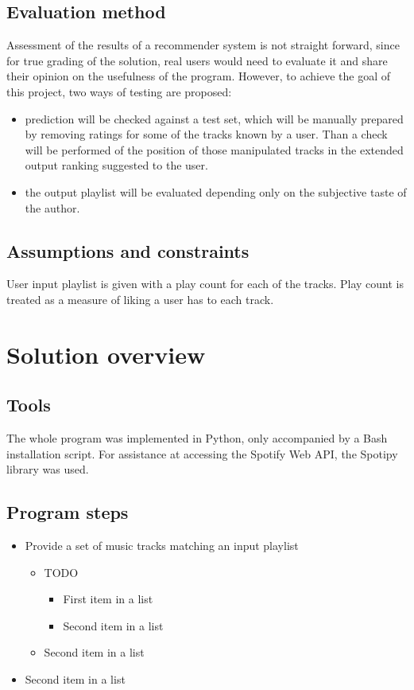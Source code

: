 \documentclass{article}
\numberwithin{equation}{section}		%
\numberwithin{figure}{section}			%
\numberwithin{table}{section}				%
\begin{document}
\subsection{Evaluation method}
Assessment of the results of a recommender system is not straight forward, since for true grading of the solution, real users would need to evaluate it and share their opinion on the usefulness of the program. However, to achieve the goal of this project, two ways of testing are proposed:
\begin{itemize}
\item prediction will be checked against a test set, which will be manually prepared by removing ratings for some of the tracks known by a user. Than a check will be performed of the position of those manipulated tracks in the extended output ranking suggested to the user.
\item the output playlist will be evaluated depending only on the subjective taste of the author.
\end{itemize}

\subsection{Assumptions and constraints}
User input playlist is given with a play count for each of the tracks. Play count is treated as a measure of liking a user has to each track.

\section{Solution overview}

\subsection{Tools}
The whole program was implemented in Python, only accompanied by a Bash installation script. For assistance at accessing the Spotify Web API, the Spotipy library was used.

\subsection{Program steps}
\begin{itemize}
	\item Provide a set of music tracks matching an input playlist
		\begin{itemize}
		\item TODO
			\begin{itemize}
			\item First item in a list 
			\item Second item in a list 
			\end{itemize}
		\item Second item in a list 
		\end{itemize}
	\item Second item in a list 
\end{itemize}
\end{document}
